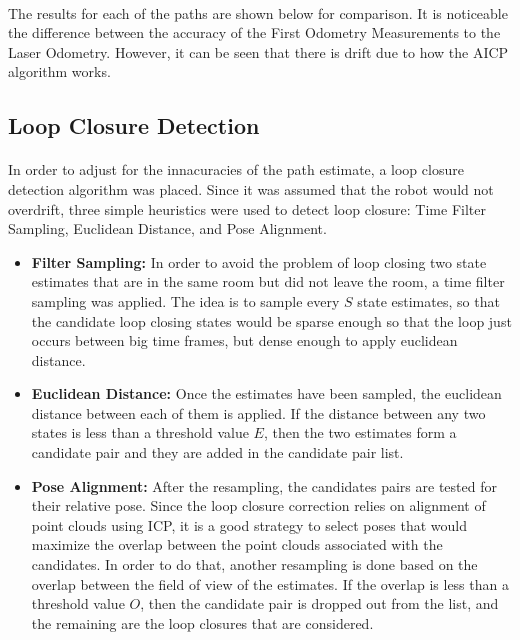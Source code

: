 \documentclass[11pt]{article}
\begin{document}
	\paragraph{}
	The results for each of the paths are shown below for comparison. It is noticeable the difference between the accuracy of the First Odometry Measurements to the Laser Odometry. However, it can be seen that there is drift due to how the AICP algorithm works.
	
	\subsection{Loop Closure Detection}
	\paragraph{}
	In order to adjust for the innacuracies of the path estimate, a loop closure detection algorithm was placed. Since it was assumed that the robot would not overdrift, three simple heuristics were used to detect loop closure: Time Filter Sampling, Euclidean Distance, and Pose Alignment. 
	\begin{itemize}
		\item \textbf{Filter Sampling:} In order to avoid the problem of loop closing two state estimates that are in the same room but did not leave the room, a time filter sampling was applied. The idea is to sample every $S$ state estimates, so that the candidate loop closing states would be sparse enough so that the loop just occurs between big time frames, but dense enough to apply euclidean distance.
		\item \textbf{Euclidean Distance:} Once the estimates have been  sampled, the euclidean distance between each of them is applied. If the distance between any two states is less than a threshold value $E$, then the two estimates form a candidate pair and they are added in the candidate pair list.
		\item \textbf{Pose Alignment:} After the resampling, the candidates pairs are tested for their relative pose. Since the loop closure correction relies on alignment of point clouds using ICP, it is a good strategy to select poses that would maximize the overlap between the point clouds associated with the candidates. In order to do that, another resampling is done based on the overlap between the field of view of the estimates. If the overlap is less than a threshold value $O$, then the candidate pair is dropped out from the list, and the remaining are the loop closures that are considered.
	\end{itemize}
	
\end{document}
